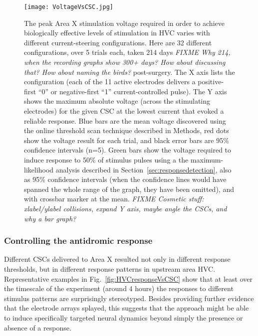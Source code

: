 \documentclass[10pt,letterpaper]{article}
\newcommand\fig[1]{Fig.~\ref{#1}}
\newcommand\sref[1]{Section~\ref{#1}}
\newcommand{\noprint}[1]{}
\begin{document}
\noprint{FIXME: The following caveat doesn't apply to
  lw95rhp-2015-12-04: Each threshold scan terminated when a
  stimulation voltage over 3 V was detected, so for some datasets
  (e.g. lw95rhp-2015-12-09) we were unable to acquire all five
  measurements for some CSCs, and thus they are worse than the figure
  shows.}

\begin{figure}
  \texttt{[image: VoltageVsCSC.jpg]}
  \caption{The peak Area X stimulation voltage required in order to
    achieve biologically effective levels of stimulation in HVC varies
    with different current-steering configurations.  Here are 32
    different configurations, over 5 trials each, taken 214 days {\em FIXME Why 214, when the recording graphs show 300+ days? How about discussing that? How about naming the birds?}
    post-surgery.  The X axis lists the configuration (each of the 11
    active electrodes delivers a positive-first ``0'' or
    negative-first ``1'' current-controlled pulse).  The Y axis shows
    the maximum absolute voltage (across the stimulating electrodes) for the given CSC at the
    lowest current that evoked a reliable response.  Blue bars are the
    mean voltage discovered using the online threshold scan technique
    described in Methods, red dots show the voltage result for each
    trial, and black error bars are 95\% confidence intervals (n=5).  Green
    bars show the voltage required to induce response to 50\% of
    stimulus pulses using a the maximum-likelihood analysis described in
    \sref{sec:responsedetection}, also as 95\% confidence intervals (when the confidence
    lines would have spanned the whole range of the graph, they have
    been omitted), and with crossbar marker at the mean.
    {\em FIXME Cosmetic stuff: xlabel/ylabel collisions, expand Y axis, maybe angle the CSCs, and why a bar graph?}}
  \label{fig:VoltageVsCSC}
\end{figure}

\subsubsection{Controlling the antidromic response}

Different CSCs delivered to Area X resulted not only in different response thresholds, but in different response patterns in upstream area HVC. Representative
examples in \fig{fig:HVCresponseVsCSC} show that at least over the timescale of the experiment (around 4 hours) the responses to different stimulus patterns are surprisingly stereotyped. Besides providing further
evidence that the electrode arrays splayed, this suggests that the
approach might be able to induce specifically targeted neural dynamics
beyond simply the presence or absence of a response.
\end{document}
